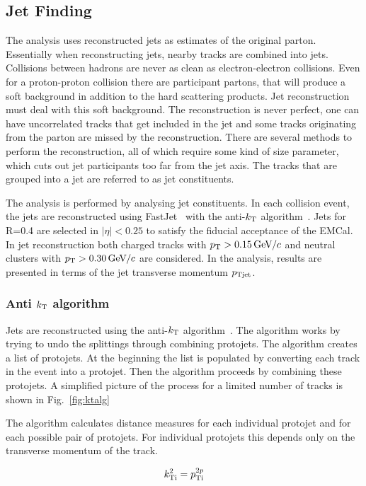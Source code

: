 \subsection{Jet Finding}
The analysis uses reconstructed jets as estimates of the original parton. Essentially when reconstructing jets, nearby tracks are combined into jets. Collisions between hadrons are never as clean as electron-electron collisions. Even for a proton-proton collision there are participant partons, that will produce a soft background in addition to the hard scattering products. Jet reconstruction must deal with this soft background. The reconstruction is never perfect, one can have uncorrelated tracks that get included in the jet and some tracks originating from the parton are missed by the reconstruction. There are several methods to perform the reconstruction, all of which require some kind of size parameter, which cuts out jet participants too far from the jet axis. The tracks that are grouped into a jet are referred to as jet constituents. 

The analysis is performed by analysing jet constituents. In each collision event, the jets are reconstructed using FastJet~\cite{fastjet} with the anti-$k_{\rm T}$ algorithm~\cite{antikt}. Jets for R=0.4 are selected in $\left| \eta \right| < 0.25 $ to satisfy the fiducial acceptance of the EMCal. In jet reconstruction both charged tracks with $p_{\rm T}>0.15\,\mathrm{GeV}\kern-0.05em/\kern-0.02em c$ and neutral clusters with $p_{\rm T}>0.30\,\mathrm{GeV}\kern-0.05em/\kern-0.02em c$ are considered. In the analysis, results are presented in terms of the jet transverse momentum $p_{\rm Tjet}$. 

\subsubsection{Anti $k_{\rm T}$ algorithm}
Jets are reconstructed using the anti-$k_{\rm T}$ algorithm~\cite{antikt}. The algorithm works by trying to undo the splittings through combining protojets. The algorithm creates a list of protojets. At the beginning the list is populated by converting each track in the event into a protojet. Then the algorithm proceeds by combining these protojets. A simplified picture of the process for a limited number of tracks is shown in Fig.~\ref{fig:ktalg}

The algorithm calculates distance measures for each individual protojet and for each possible pair of protojets. For individual protojets this depends only on the transverse momentum of the track.

\begin{equation}
k_{\rm Ti}^2=p_{\rm Ti}^{2p}
\end{equation}

